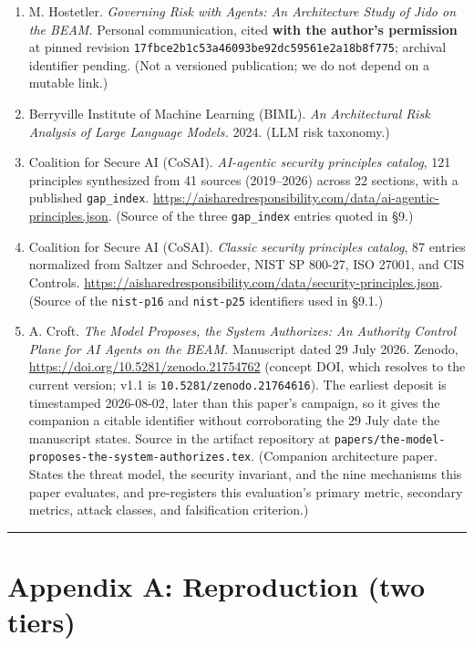 \documentclass[11pt]{article}
\begin{document}
\begin{enumerate}
\item
 M. Hostetler. \emph{Governing Risk with Agents: An Architecture Study of Jido on the BEAM.}
 Personal communication, cited \textbf{with the author's permission} at pinned revision
 \texttt{17fbce2b1c53a46093be92dc59561e2a18b8f775}; archival identifier pending. (Not a versioned
 publication; we do not depend on a mutable link.)
\item
 Berryville Institute of Machine Learning (BIML). \emph{An Architectural Risk Analysis of Large
 Language Models.} 2024. (LLM risk taxonomy.)
\item
 Coalition for Secure AI (CoSAI). \emph{AI-agentic security principles catalog}, 121 principles
  synthesized from 41 sources (2019--2026) across 22 sections, with a published \texttt{gap\_index}.
  \url{https://aisharedresponsibility.com/data/ai-agentic-principles.json}. (Source of the three
  \texttt{gap\_index} entries quoted in \S9.)
\item
  Coalition for Secure AI (CoSAI). \emph{Classic security principles catalog}, 87 entries
  normalized from Saltzer and Schroeder, NIST SP 800-27, ISO 27001, and CIS Controls.
  \url{https://aisharedresponsibility.com/data/security-principles.json}. (Source of the
  \texttt{nist-p16} and \texttt{nist-p25} identifiers used in \S9.1.)
\item
  A. Croft. \emph{The Model Proposes, the System Authorizes: An Authority Control Plane for AI
  Agents on the BEAM.} Manuscript dated 29 July 2026. Zenodo,
  \url{https://doi.org/10.5281/zenodo.21754762} (concept DOI, which resolves to the current
  version; v1.1 is \texttt{10.5281/zenodo.21764616}). The earliest deposit is timestamped
  2026-08-02, later than this paper's campaign, so it gives the companion a citable identifier
  without corroborating the 29 July date the manuscript states. Source in the artifact repository at
  \texttt{papers/the-model-proposes-the-system-authorizes.tex}. (Companion
 architecture paper. States the threat model, the security invariant, and the nine mechanisms
 this paper evaluates, and pre-registers this evaluation's primary metric, secondary metrics,
 attack classes, and falsification criterion.)
\end{enumerate}

\begin{center}\rule{0.5\linewidth}{0.5pt}\end{center}

\section*{Appendix A: Reproduction (two tiers)}\label{appendix-a-reproduction-two-tiers}
\end{document}
